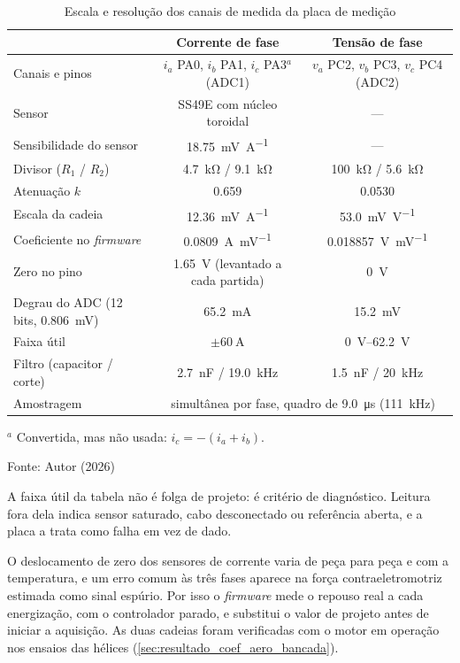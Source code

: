 \begin{table}[H]
    \centering
    \caption{Escala e resolução dos canais de medida da placa de medição}
    \label{tab:resultado_calibracao_canal_same}
    \footnotesize
    \setlength{\tabcolsep}{3.5pt}
    \begin{tabular}{lcc}
        \toprule
        & \textbf{Corrente de fase} & \textbf{Tensão de fase} \\
        \midrule
        Canais e pinos & $i_a$ PA0, $i_b$ PA1, $i_c$ PA3$^{a}$ (ADC1) & $v_a$ PC2, $v_b$ PC3, $v_c$ PC4 (ADC2) \\
        Sensor & SS49E com núcleo toroidal & --- \\
        Sensibilidade do sensor & \SI{18,75}{\milli\volt\per\ampere} & --- \\
        Divisor ($R_1$ / $R_2$) & \SI{4,7}{\kilo\ohm} / \SI{9,1}{\kilo\ohm} & \SI{100}{\kilo\ohm} / \SI{5,6}{\kilo\ohm} \\
        Atenuação $k$ & \num{0,659} & \num{0,0530} \\
        Escala da cadeia & \SI{12,36}{\milli\volt\per\ampere} & \SI{53,0}{\milli\volt\per\volt} \\
        Coeficiente no \textit{firmware} & \SI{0,0809}{\ampere\per\milli\volt} & \SI{0,018857}{\volt\per\milli\volt} \\
        Zero no pino & \SI{1,65}{\volt} (levantado a cada partida) & \SI{0}{\volt} \\
        Degrau do ADC (12 bits, \SI{0,806}{\milli\volt}) & \SI{65,2}{\milli\ampere} & \SI{15,2}{\milli\volt} \\
        Faixa útil & $\pm\SI{60}{\ampere}$ & \SIrange{0}{62,2}{\volt} \\
        Filtro (capacitor / corte) & \SI{2,7}{\nano\farad} / \SI{19,0}{\kilo\hertz} & \SI{1,5}{\nano\farad} / \SI{20}{\kilo\hertz} \\
        Amostragem & \multicolumn{2}{c}{simultânea por fase, quadro de \SI{9,0}{\micro\second} (\SI{111}{\kilo\hertz})} \\
        \bottomrule
    \end{tabular}

    \vspace{2pt}
    {\footnotesize $^{a}$ Convertida, mas não usada: $i_c = -(i_a + i_b)$.}

    {\small Fonte: Autor (2026)}
\end{table}

A faixa útil da tabela não é folga de projeto: é critério de diagnóstico.
Leitura fora dela indica sensor saturado, cabo desconectado ou referência
aberta, e a placa a trata como falha em vez de dado.

O deslocamento de zero dos sensores de corrente varia de peça para peça e com
a temperatura, e um erro comum às três fases aparece na força contraeletromotriz
estimada como sinal espúrio. Por isso o \textit{firmware} mede o repouso real
a cada energização, com o controlador parado, e substitui o valor de projeto
antes de iniciar a aquisição. As duas cadeias foram verificadas com o motor em
operação nos ensaios das hélices (\autoref{sec:resultado_coef_aero_bancada}).
